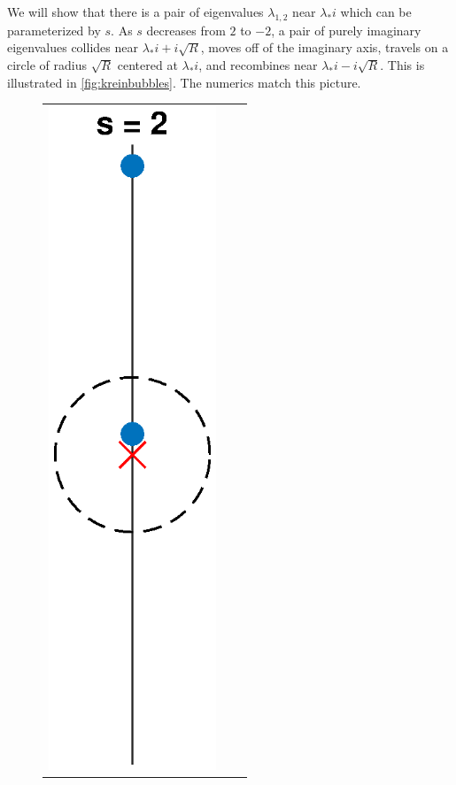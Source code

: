 \documentclass[thesis.tex]{subfiles}
\begin{document}
We will show that there is a pair of eigenvalues $\lambda_{1,2}$ near $\lambda_* i$ which can be parameterized by $s$. As $s$ decreases from $2$ to $-2$, a pair of purely imaginary eigenvalues collides near $\lambda_* i + i \sqrt{R}$, moves off of the imaginary axis, travels on a circle of radius $\sqrt{R}$ centered at $\lambda_* i$, and recombines near $\lambda_* i - i \sqrt{R}$. This is illustrated in \cref{fig:kreinbubbles}. The numerics match this picture.
\begin{figure}
\begin{center}
\begin{tabular}{ccc}
\includegraphics[width=5cm]{images/kreinbubbles/bubble2R} &

\end{tabular}
\end{center}
\end{figure}
\end{document}
